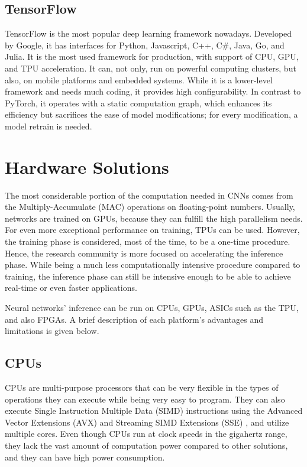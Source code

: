 \subsection{TensorFlow}
TensorFlow \cite{TensorFlow-Large-Scale-Machine-Learning-on-Heterogeneous-Distributed-Systems} \cite{TensorFlow-Official-site} \cite{TensorFlow-Wikipedia} is the most popular deep learning framework nowadays. Developed by Google, it has interfaces for Python, Javascript, C++, C\#, Java, Go, and Julia. It is the most used framework for production, with support of CPU, GPU, and TPU acceleration. It can, not only, run on powerful computing clusters, but also, on mobile platforms and embedded systems. While it is a lower-level framework and needs much coding, it provides high configurability. In contrast to PyTorch, it operates with a static computation graph, which enhances its efficiency but sacrifices the ease of model modifications; for every modification, a model retrain is needed.

\section{Hardware Solutions}
The most considerable portion of the computation needed in CNNs comes from the Multiply-Accumulate (MAC) operations on floating-point numbers. Usually, networks are trained on GPUs, because they can fulfill the high parallelism needs. For even more exceptional performance on training, TPUs can be used. However, the training phase is considered, most of the time, to be a one-time procedure. Hence, the research community is more focused on accelerating the inference phase. While being a much less computationally intensive procedure compared to training, the inference phase can still be intensive enough to be able to achieve real-time or even faster applications.

Neural networks' inference can be run on CPUs, GPUs, ASICs such as the TPU, and also FPGAs. A brief description of each platform's advantages and limitations is given below.

\subsection{CPUs}
CPUs are multi-purpose processors that can be very flexible in the types of operations they can execute while being very easy to program. They can also execute Single Instruction Multiple Data (SIMD) instructions using the Advanced Vector Extensions (AVX) \cite{AVX-Wikipedia} and Streaming SIMD Extensions (SSE) \cite{SSE-Wikipedia}, and utilize multiple cores. Even though CPUs run at clock speeds in the gigahertz range, they lack the vast amount of computation power compared to other solutions, and they can have high power consumption.

